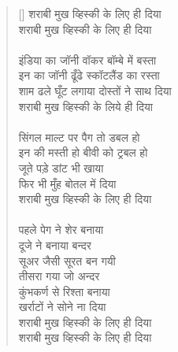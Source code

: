 \begin{verse}[\versewidth]\texthindi{
शराबी मुख व्हिस्की के लिए ही दिया\\
शराबी मुख व्हिस्की के लिए ही दिया\\
\\
इंडिया का जॉनी वॉकर बॉम्बे में बस्ता\\
इन का जॉनी ढूँढे स्कॉटलैंड का रस्ता\\
शाम ढले घूँट लगाया दोस्तों ने साथ दिया\\
शराबी मुख व्हिस्की के लिये ही दिया\\
\\
सिंगल माल्ट पर पैग तो डबल हो\\
इन की मस्ती हो बीवी को ट्रबल हो\\
जूते पड़े डांट भी खाया\\
फिर भी मुँह बोतल में दिया\\
शराबी मुख व्हिस्की के लिए ही दिया\\
\\
पहले पेग ने शेर बनाया\\
दूजे ने बनाया बन्दर\\
सूअर जैसी सूरत बन गयी\\
तीसरा गया जो अन्दर\\
कुंभकर्ण से रिश्ता बनाया\\
खर्राटों ने सोने ना दिया\\
शराबी मुख व्हिस्की के लिए ही दिया\\
शराबी मुख व्हिस्की के लिए ही दिया
}\end{verse}

